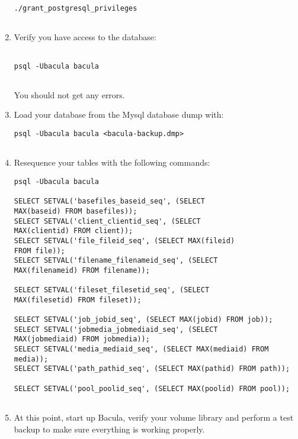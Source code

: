 \begin{enumerate}
\begin{verbatim}
./grant_postgresql_privileges
       
\end{verbatim}
\normalsize

\item Verify you have access to the database:  

   \footnotesize
\begin{verbatim}
  
psql -Ubacula bacula
      
\end{verbatim}
\normalsize

You should not get any errors.  
\item Load your database from the Mysql database dump with:  

   \footnotesize
\begin{verbatim}
psql -Ubacula bacula <bacula-backup.dmp>
      
\end{verbatim}
\normalsize

\item Resequence your tables with the following commands:  

   \footnotesize
\begin{verbatim}
psql -Ubacula bacula
                
SELECT SETVAL('basefiles_baseid_seq', (SELECT
MAX(baseid) FROM basefiles));
SELECT SETVAL('client_clientid_seq', (SELECT
MAX(clientid) FROM client));
SELECT SETVAL('file_fileid_seq', (SELECT MAX(fileid)
FROM file));
SELECT SETVAL('filename_filenameid_seq', (SELECT
MAX(filenameid) FROM filename));
                
SELECT SETVAL('fileset_filesetid_seq', (SELECT
MAX(filesetid) FROM fileset));
                
SELECT SETVAL('job_jobid_seq', (SELECT MAX(jobid) FROM job));
SELECT SETVAL('jobmedia_jobmediaid_seq', (SELECT
MAX(jobmediaid) FROM jobmedia));
SELECT SETVAL('media_mediaid_seq', (SELECT MAX(mediaid) FROM media));
SELECT SETVAL('path_pathid_seq', (SELECT MAX(pathid) FROM path));
                
SELECT SETVAL('pool_poolid_seq', (SELECT MAX(poolid) FROM pool));
       
\end{verbatim}
\normalsize

\item At this point, start up Bacula, verify your volume library and  perform
   a test backup to make sure everything is working  properly. 
\end{enumerate}

